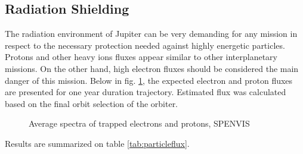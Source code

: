 \newpage
\subsection{Radiation Shielding}
The radiation environment of Jupiter can be very demanding for any mission in respect to the necessary protection needed against highly energetic particles. Protons and other heavy ions fluxes appear similar to other interplanetary missions. On the other hand, high electron fluxes should be considered the main danger of this mission.
Below in fig. \ref{fig:eleprotflux}, the expected electron and proton fluxes are presented for one year duration trajectory. Estimated flux was calculated based on the final orbit selection of the orbiter.

\begin{figure}[htb!]
\captionsetup[subfigure]{width=0.45\textwidth}
 
\caption{Average spectra of trapped electrons and protons, SPENVIS}
\label{fig:eleprotflux}
\end{figure}
Results are summarized on table \ref{tab:particleflux}. 

